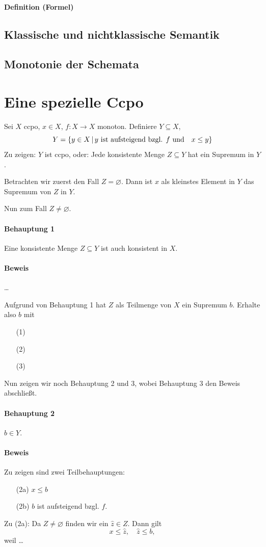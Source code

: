 \documentclass[a4paper,11pt,abstracton]{scrartcl}
\begin{document}
\paragraph{Definition (Formel)} 
\subsection{Klassische und nichtklassische Semantik}
\subsection{Monotonie der Schemata}

\newpage
\section*{Eine spezielle Ccpo}
Sei $X$ ccpo, $x \in X$, $f\colon X \to X$ monoton. Definiere $Y \subseteq X$,
\begin{equation*}
 Y = \{ y \in X \, | \, y \textnormal{ ist aufsteigend bzgl. } f \textnormal{ und}\quad x \leq y \}
\end{equation*}
Zu zeigen: $Y$ ist ccpo, oder: Jede konsistente Menge $Z \subseteq Y$ hat ein Supremum in $Y$.

Betrachten wir zuerst den Fall $Z = \varnothing$. Dann ist $x$ als kleinstes Element in $Y$ das Supremum von $Z$ in $Y$.

Nun zum Fall $Z \neq \varnothing$.
\paragraph{Behauptung 1} Eine konsistente Menge $Z \subseteq Y$ ist auch konsistent in $X$.
\paragraph{Beweis} …

Aufgrund von Behauptung 1 hat $Z$ als Teilmenge von $X$ ein Supremum $b$. Erhalte also $b$ mit
\begin{enumerate}
 \item[(1)]
 \item[(2)]
 \item[(3)]
\end{enumerate}
Nun zeigen wir noch Behauptung 2 und 3, wobei Behauptung 3 den Beweis abschließt.
\paragraph{Behauptung 2} $b \in Y$.
\paragraph{Beweis} Zu zeigen sind zwei Teilbehauptungen:
\begin{enumerate}
 \item[(2a)] $x \leq b$
 \item[(2b)] $b$ ist aufsteigend bzgl. $f$.
\end{enumerate}
Zu (2a): Da $Z \neq \varnothing$ finden wir ein $\hat z \in Z$. Dann gilt
\begin{equation}
 x \leq \hat z, \quad \hat z \leq b,
\end{equation}
weil …
\end{document}
